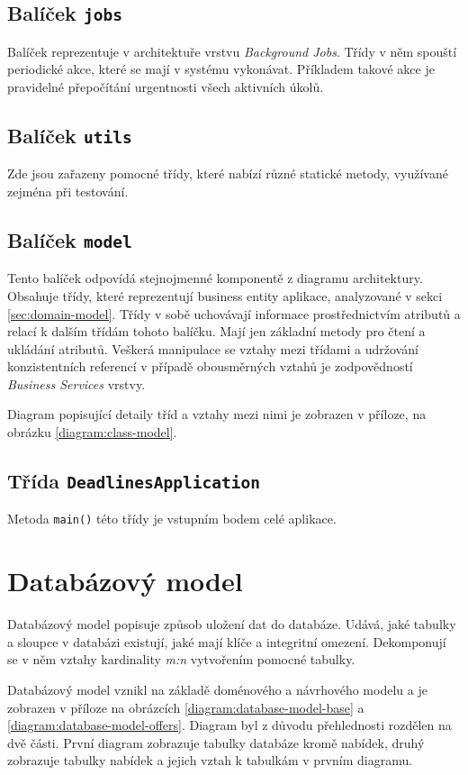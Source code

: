 \documentclass[thesis=B,czech]{FITthesis}[2012/06/26]
\begin{document}
		\subsection{Balíček \texttt{jobs}}
			Balíček reprezentuje v architektuře vrstvu \textit{Background Jobs}. Třídy v něm spouští periodické akce, které se mají v systému vykonávat. Příkladem takové akce je pravidelné přepočítání urgentnosti všech aktivních úkolů.
			
		\subsection{Balíček \texttt{utils}}
			Zde jsou zařazeny pomocné třídy, které nabízí různé statické metody, využívané zejména při testování.
			
		\subsection{Balíček \texttt{model}}
			Tento balíček odpovídá stejnojmenné komponentě z diagramu architektury. Obsahuje třídy, které reprezentují business entity aplikace, analyzované v sekci \ref{sec:domain-model}. Třídy v sobě uchovávají informace prostřednictvím atributů a relací k dalším třídám tohoto balíčku. Mají jen základní metody pro čtení a ukládání atributů. Veškerá manipulace se vztahy mezi třídami a udržování konzistentních referencí v případě obousměrných vztahů je zodpovědností \textit{Business Services} vrstvy. 
			
			Diagram popisující detaily tříd a vztahy mezi nimi je zobrazen v příloze, na obrázku \ref{diagram:class-model}.
			
		\subsection{Třída \texttt{DeadlinesApplication}}
			Metoda \texttt{main()} této třídy je vstupním bodem celé aplikace.
		
		
	
	\section{Databázový model}
		Databázový model popisuje způsob uložení dat do databáze. Udává, jaké tabulky a sloupce v databázi existují, jaké mají klíče a integritní omezení. Dekomponují se v něm vztahy kardinality \textit{m:n} vytvořením pomocné tabulky.
		
		Databázový model vznikl na základě doménového a návrhového modelu a je zobrazen v příloze na obrázcích \ref{diagram:database-model-base} a \ref{diagram:database-model-offers}. Diagram byl z důvodu přehlednosti rozdělen na dvě části. První diagram zobrazuje tabulky databáze kromě nabídek, druhý zobrazuje tabulky nabídek a jejich vztah k tabulkám v prvním diagramu.
		
\end{document}

